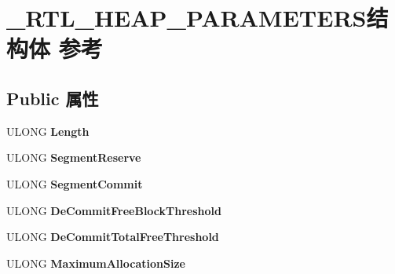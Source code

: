 \hypertarget{struct___r_t_l___h_e_a_p___p_a_r_a_m_e_t_e_r_s}{}\section{\+\_\+\+R\+T\+L\+\_\+\+H\+E\+A\+P\+\_\+\+P\+A\+R\+A\+M\+E\+T\+E\+R\+S结构体 参考}
\label{struct___r_t_l___h_e_a_p___p_a_r_a_m_e_t_e_r_s}
\subsection*{Public 属性}
\begin{DoxyCompactItemize}
\item 
\mbox{\label{struct___r_t_l___h_e_a_p___p_a_r_a_m_e_t_e_r_s_a7b44b42c99b96b4b8b357662b119f173}} 
U\+L\+O\+NG {\bfseries Length}
\item 
\mbox{\label{struct___r_t_l___h_e_a_p___p_a_r_a_m_e_t_e_r_s_ad48ba93650fbbe5fc5d67ab79c3006e2}} 
U\+L\+O\+NG {\bfseries Segment\+Reserve}
\item 
\mbox{\label{struct___r_t_l___h_e_a_p___p_a_r_a_m_e_t_e_r_s_a427c797d070b2bca68a36ed7cf9646ce}} 
U\+L\+O\+NG {\bfseries Segment\+Commit}
\item 
\mbox{\label{struct___r_t_l___h_e_a_p___p_a_r_a_m_e_t_e_r_s_a160fbb82b6c62700b4747774b04d0064}} 
U\+L\+O\+NG {\bfseries De\+Commit\+Free\+Block\+Threshold}
\item 
\mbox{\label{struct___r_t_l___h_e_a_p___p_a_r_a_m_e_t_e_r_s_ad09250256e5b70fab75237e775882572}} 
U\+L\+O\+NG {\bfseries De\+Commit\+Total\+Free\+Threshold}
\item 
\mbox{\label{struct___r_t_l___h_e_a_p___p_a_r_a_m_e_t_e_r_s_af443fe2fc9347b890f3f3cc8356639ea}} 
U\+L\+O\+NG {\bfseries Maximum\+Allocation\+Size}
\item 
\mbox{\label{struct___r_t_l___h_e_a_p___p_a_r_a_m_e_t_e_r_s_acb9b853de006647fdf16011e187c8354}} 

\end{DoxyCompactItemize}
